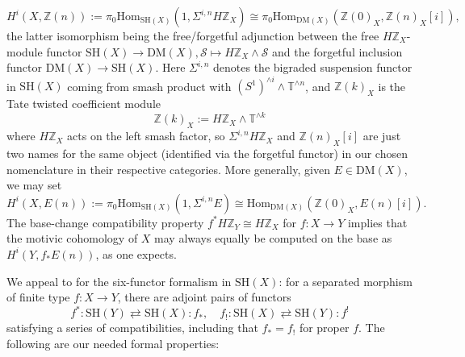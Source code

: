 \documentclass[a4paper,reqno,11pt]{amsart}
\theoremstyle{plain}
\theoremstyle{definition}
\theoremstyle{remark}
\newcommand{\Z}{\mathbb{Z}}
\newcommand{\T}{\mathbb{T}}
\newcommand{\DM}{\mathrm{DM}}
\newcommand{\SH}{\mathrm{SH}}
\newcommand{\Hom}{\mathrm{Hom}}
\begin{document}
\[
    H^i(X,\Z(n)) := \pi_0\Hom_{\SH(X)}(1, \Sigma^{i,n} H\Z_X) \cong \pi_0\Hom_{\DM(X)}(\Z(0)_X,\Z(n)_X[i]),
\]
the latter isomorphism being the free/forgetful adjunction between the free $H\Z_X$-module functor $\SH(X) \to \DM(X), \mathcal{S}\mapsto H\Z_X \wedge \mathcal{S}$ and the forgetful inclusion functor $\DM(X) \to \SH(X)$. Here $\Sigma^{i,n}$ denotes the bigraded suspension functor in $\SH(X)$ coming from smash product with $(S^1)^{\wedge i} \wedge \T^{\wedge n}$, and $\Z(k)_X$ is the Tate twisted coefficient module
\[
    \Z(k)_X := H\Z_X \wedge \T^{\wedge k}
\]
where $H\Z_X$ acts on the left smash factor, so $\Sigma^{i,n} H\Z_X$ and $\Z(n)_X[i]$ are just two names for the same object (identified via the forgetful functor) in our chosen nomenclature in their respective categories. More generally, given $E\in \DM(X)$, we may set 
\[
H^i(X, E(n)) := \pi_0\Hom_{\SH(X)}(1, \Sigma^{i,n}E) \cong \Hom_{\DM(X)} (\Z(0)_X, E(n)[i]).
\]
The base-change compatibility property $f^* H\Z_Y \cong  H\Z_X$ for $f:X\to Y$ implies that the motivic cohomology of $X$ may always equally be computed on the base as $H^i(Y, f_*E(n))$, as one expects.

We appeal to \cite{Hoy} for the six-functor formalism in $\SH(X)$: for a separated morphism of finite type $f:X\to Y$, there are adjoint pairs of functors
    \[
    f^*:\SH(Y) \rightleftarrows \SH(X): f_*,\quad f_!: \SH(X) \rightleftarrows \SH(Y): f^!
    \]
satisfying a series of compatibilities, including that $f_*=f_!$ for proper $f$. The following are our needed formal properties:
\end{document}
